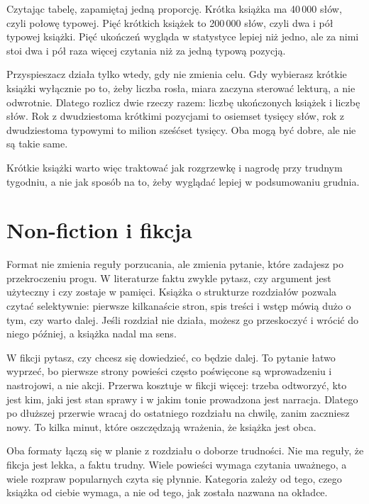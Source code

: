 
Czytając tabelę, zapamiętaj jedną proporcję. Krótka książka ma 40\,000 słów, czyli połowę typowej. Pięć krótkich książek to 200\,000 słów, czyli dwa i pół typowej książki. Pięć ukończeń wygląda w statystyce lepiej niż jedno, ale za nimi stoi dwa i pół raza więcej czytania niż za jedną typową pozycją.

Przyspieszacz działa tylko wtedy, gdy nie zmienia celu. Gdy wybierasz krótkie książki wyłącznie po to, żeby liczba rosła, miara zaczyna sterować lekturą, a nie odwrotnie. Dlatego rozlicz dwie rzeczy razem: liczbę ukończonych książek i liczbę słów. Rok z dwudziestoma krótkimi pozycjami to osiemset tysięcy słów, rok z dwudziestoma typowymi to milion sześćset tysięcy. Oba mogą być dobre, ale nie są takie same.

Krótkie książki warto więc traktować jak rozgrzewkę i nagrodę przy trudnym tygodniu, a nie jak sposób na to, żeby wyglądać lepiej w podsumowaniu grudnia.

\section{Non-fiction i fikcja}

Format nie zmienia reguły porzucania, ale zmienia pytanie, które zadajesz po przekroczeniu progu. W literaturze faktu zwykle pytasz, czy argument jest użyteczny i czy zostaje w pamięci. Książka o strukturze rozdziałów pozwala czytać selektywnie: pierwsze kilkanaście stron, spis treści i wstęp mówią dużo o tym, czy warto dalej. Jeśli rozdział nie działa, możesz go przeskoczyć i wrócić do niego później, a książka nadal ma sens.

W fikcji pytasz, czy chcesz się dowiedzieć, co będzie dalej. To pytanie łatwo wyprzeć, bo pierwsze strony powieści często poświęcone są wprowadzeniu i nastrojowi, a nie akcji. Przerwa kosztuje w fikcji więcej: trzeba odtworzyć, kto jest kim, jaki jest stan sprawy i w jakim tonie prowadzona jest narracja. Dlatego po dłuższej przerwie wracaj do ostatniego rozdziału na chwilę, zanim zaczniesz nowy. To kilka minut, które oszczędzają wrażenia, że książka jest obca.

Oba formaty łączą się w planie z rozdziału o doborze trudności. Nie ma reguły, że fikcja jest lekka, a faktu trudny. Wiele powieści wymaga czytania uważnego, a wiele rozpraw popularnych czyta się płynnie. Kategoria zależy od tego, czego książka od ciebie wymaga, a nie od tego, jak została nazwana na okładce.

